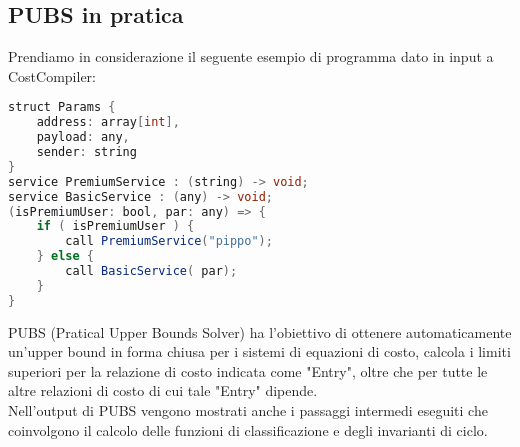 \documentclass[../../main.tex]{subfiles}
\begin{document}
\subsection{PUBS in pratica}
Prendiamo in considerazione il seguente esempio di programma dato in input a CostCompiler:
\begin{lstlisting}[language=Java,caption={Listing 1}]
struct Params {
	address: array[int],
	payload: any,
	sender: string
}
service PremiumService : (string) -> void;
service BasicService : (any) -> void;
(isPremiumUser: bool, par: any) => {
	if ( isPremiumUser ) {
		call PremiumService("pippo");
	} else {
		call BasicService( par);
	}
}
\end{lstlisting}

PUBS (Pratical Upper Bounds Solver) ha l'obiettivo di ottenere automaticamente un'upper bound in forma chiusa per i sistemi di equazioni di costo, calcola i limiti superiori per la relazione di costo indicata come "Entry", oltre che per tutte le altre relazioni di costo di cui tale "Entry" dipende.\\
Nell'output di PUBS vengono mostrati anche i passaggi intermedi eseguiti che coinvolgono il calcolo delle funzioni di classificazione e degli invarianti di ciclo.
\end{document}
